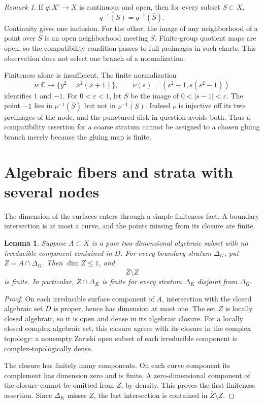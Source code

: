 \documentclass[11pt]{article}
\newcommand{\C}{\mathbb C}
\newcommand{\cl}[1]{\overline{#1}}
\newtheorem{lemma}[theorem]{Lemma}
\theoremstyle{definition}
\theoremstyle{remark}
\newtheorem{remark}[theorem]{Remark}
\begin{document}
\begin{remark}\label{rem:branches}
If $q:X'\to X$ is continuous and open, then for every subset $S\subset X$,
\[
 \cl{q^{-1}(S)}=q^{-1}(\cl S).
\]
Continuity gives one inclusion. For the other, the image of any neighborhood of a point over $\cl S$ is an open neighborhood meeting $S$. Finite-group quotient maps are open, so the compatibility condition passes to full preimages in such charts. This observation does not select one branch of a normalization.

Finiteness alone is insufficient. The finite normalization
\[
 \nu:\C\longrightarrow\{y^2=x^2(x+1)\},\qquad
 \nu(s)=(s^2-1,s(s^2-1))
\]
identifies $1$ and $-1$. For $0<\varepsilon<1$, let $S$ be the image of $0<|s-1|<\varepsilon$. The point $-1$ lies in $\nu^{-1}(\cl S)$ but not in $\cl{\nu^{-1}(S)}$. Indeed $\nu$ is injective off its two preimages of the node, and the punctured disk in question avoids both. Thus a compatibility assertion for a coarse stratum cannot be assigned to a chosen gluing branch merely because the gluing map is finite.
\end{remark}

\section{Algebraic fibers and strata with several nodes}\label{sec:algebraic}

The dimension of the surfaces enters through a simple finiteness fact. A boundary intersection is at most a curve, and the points missing from its closure are finite.

\begin{lemma}\label{lem:frontier}
Suppose $A\subset X$ is a pure two-dimensional algebraic subset with no irreducible component contained in $D$. For every boundary stratum $\Delta_G$, put $Z=A\cap\Delta_G$. Then $\dim Z\leq1$, and
\[
 \cl Z\setminus Z
\]
is finite. In particular, $\cl Z\cap\Delta_K$ is finite for every stratum $\Delta_K$ disjoint from $\Delta_G$.
\end{lemma}

\begin{proof}
On each irreducible surface component of $A$, intersection with the closed algebraic set $D$ is proper, hence has dimension at most one. The set $Z$ is locally closed algebraic, so it is open and dense in its algebraic closure. For a locally closed complex algebraic set, this closure agrees with its closure in the complex topology: a nonempty Zariski open subset of each irreducible component is complex-topologically dense.

The closure has finitely many components. On each curve component its complement has dimension zero and is finite. A zero-dimensional component of the closure cannot be omitted from $Z$, by density. This proves the first finiteness assertion. Since $\Delta_K$ misses $Z$, the last intersection is contained in $\cl Z\setminus Z$.
\end{proof}
\end{document}
